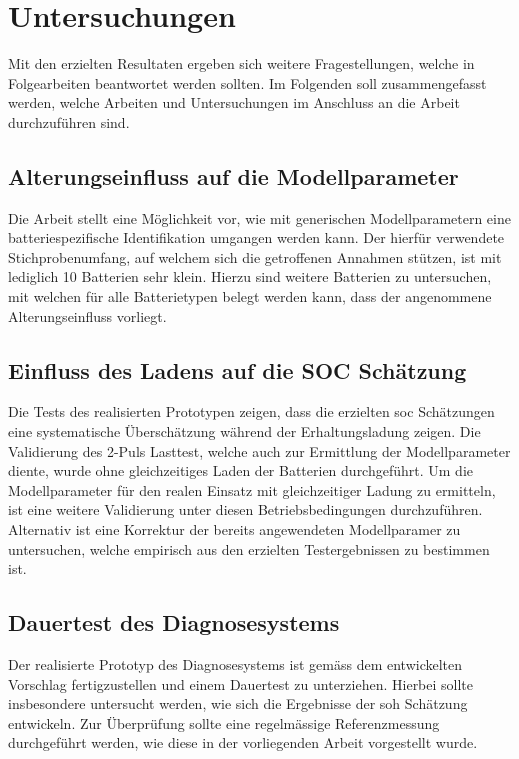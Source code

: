 \section{Untersuchungen}

Mit den erzielten Resultaten ergeben sich weitere Fragestellungen,
welche in Folgearbeiten beantwortet werden sollten. Im Folgenden
soll zusammengefasst werden, welche Arbeiten und Untersuchungen
im Anschluss an die Arbeit durchzuführen sind.

\subsection{Alterungseinfluss auf die Modellparameter}
Die Arbeit stellt eine Möglichkeit vor, wie mit generischen
Modellparametern eine batteriespezifische Identifikation
umgangen werden kann. Der hierfür verwendete Stichprobenumfang,
auf welchem sich die getroffenen Annahmen stützen, ist mit
lediglich 10 Batterien sehr klein. Hierzu sind weitere
Batterien zu untersuchen, mit welchen für alle Batterietypen
belegt werden kann, dass der angenommene Alterungseinfluss
vorliegt.

\subsection{Einfluss des Ladens auf die SOC Schätzung}
Die Tests des realisierten Prototypen zeigen, dass die erzielten
\gls{soc} Schätzungen eine systematische Überschätzung während
der Erhaltungsladung zeigen. Die Validierung des 2-Puls Lasttest,
welche auch zur Ermittlung der Modellparameter diente, wurde ohne
gleichzeitiges Laden der Batterien durchgeführt. Um die
Modellparameter für den realen Einsatz mit gleichzeitiger
Ladung zu ermitteln, ist eine weitere Validierung unter diesen
Betriebsbedingungen durchzuführen. Alternativ ist eine Korrektur
der bereits angewendeten Modellparamer zu untersuchen, welche
empirisch aus den erzielten Testergebnissen zu bestimmen ist.

\subsection{Dauertest des Diagnosesystems}
Der realisierte Prototyp des Diagnosesystems ist gemäss dem
entwickelten Vorschlag fertigzustellen und einem Dauertest
zu unterziehen. Hierbei sollte insbesondere untersucht werden,
wie sich die Ergebnisse der \gls{soh} Schätzung entwickeln.
Zur Überprüfung sollte eine regelmässige Referenzmessung
durchgeführt werden, wie diese in der vorliegenden Arbeit
vorgestellt wurde.

